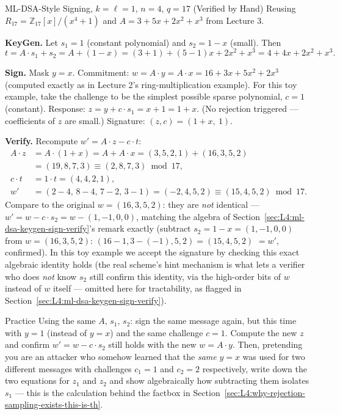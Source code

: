 \begin{exbox}{ML-DSA-Style Signing, $k=\ell=1$, $n=4$, $q=17$ (Verified by Hand)}
Reusing $R_{17}=\mathbb{Z}_{17}[x]/(x^4+1)$ and $A = 3+5x+2x^2+x^3$ from Lecture 3.

\textbf{KeyGen.} Let $s_1 = 1$ (constant polynomial) and $s_2 = 1-x$ (small). Then
$$
t = A\cdot s_1 + s_2 = A + (1-x) = (3+1) + (5-1)x+2x^2+x^3 = 4+4x+2x^2+x^3.
$$

\textbf{Sign.} Mask $y = x$. Commitment: $w = A\cdot y = A\cdot x = 16+3x+5x^2+2x^3$ (computed exactly as in Lecture 2's ring-multiplication example). For this toy example, take the challenge to be the simplest possible sparse polynomial, $c=1$ (constant). Response: $z = y + c\cdot s_1 = x + 1 = 1+x$. (No rejection triggered --- coefficients of $z$ are small.) Signature: $(z,c) = (1+x,\ 1)$.

\textbf{Verify.} Recompute $w' = A\cdot z - c\cdot t$:
\begin{align*}
A\cdot z &= A\cdot(1+x) = A + A\cdot x = (3,5,2,1) + (16,3,5,2) \\
&= (19,8,7,3) \equiv (2,8,7,3) \bmod 17, \\
c\cdot t &= 1\cdot t = (4,4,2,1), \\
w' &= (2-4,\,8-4,\,7-2,\,3-1) = (-2,4,5,2) \equiv (15,4,5,2) \bmod 17.
\end{align*}
Compare to the original $w = (16,3,5,2)$: they are \emph{not} identical --- $w' = w - c\cdot s_2 = w - (1,-1,0,0)$, matching the algebra of Section~\ref{sec:L4:ml-dsa-keygen-sign-verify}'s remark exactly (subtract $s_2=1-x=(1,-1,0,0)$ from $w=(16,3,5,2)$: $(16-1,3-(-1),5,2)=(15,4,5,2)$ $=w'$, confirmed). In this toy example we accept the signature by checking this exact algebraic identity holds (the real scheme's hint mechanism is what lets a verifier who does \emph{not} know $s_2$ still confirm this identity, via the high-order bits of $w$ instead of $w$ itself --- omitted here for tractability, as flagged in Section~\ref{sec:L4:ml-dsa-keygen-sign-verify}).
\end{exbox}

\begin{exercisebox}{Practice}
Using the same $A$, $s_1$, $s_2$: sign the same message again, but this time with $y = 1$ (instead of $y=x$) and the same challenge $c=1$. Compute the new $z$ and confirm $w' = w - c\cdot s_2$ still holds with the new $w = A\cdot y$. Then, pretending you are an attacker who somehow learned that the \emph{same} $y=x$ was used for two different messages with challenges $c_1=1$ and $c_2=2$ respectively, write down the two equations for $z_1$ and $z_2$ and show algebraically how subtracting them isolates $s_1$ --- this is the calculation behind the factbox in Section~\ref{sec:L4:why-rejection-sampling-exists-this-is-th}.
\end{exercisebox}

